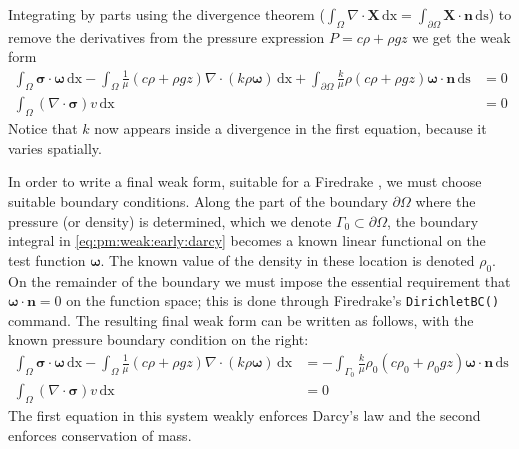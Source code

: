 \documentclass[11pt]{amsart}
\newcommand{\bn}{\mathbf{n}}
\newcommand{\bX}{\mathbf{X}}
\newcommand{\bsigma}{\bm{\sigma}}
\newcommand{\bomega}{\bm{\omega}}
\newcommand{\dx}{\mathrm{dx}}
\newcommand{\ds}{\mathrm{ds}}
\newcommand{\Div}{\nabla\cdot}
\begin{document}
Integrating by parts using the divergence theorem ($\int_\Omega \Div \bX\,\dx = \int_{\partial\Omega} \bX\cdot \bn\,\ds$) to remove the derivatives from the pressure expression $P=c\rho+\rho g z$ we get the weak form
\begin{subequations}
\label{eq:pm:weak:early}
\begin{align}
\int_\Omega \bsigma\cdot \bomega\,\dx - \int_\Omega \frac{1}{\mu} \left(c \rho + \rho g z\right) \Div(k\rho\bomega)\,\dx + \int_{\partial\Omega} \frac{k}{\mu} \rho \left(c \rho + \rho g z\right) \bomega\cdot\bn\,\ds &= 0 \label{eq:pm:weak:early:darcy}\\
\int_\Omega (\Div \bsigma) v\,\dx &= 0
\end{align}
\end{subequations}
Notice that $k$ now appears inside a divergence in the first equation, because it varies spatially.

In order to write a final weak form, suitable for a Firedrake \citep{Ham2023}, we must choose suitable boundary conditions.  Along the part of the boundary $\partial\Omega$ where the pressure (or density) is determined, which we denote $\Gamma_0 \subset \partial\Omega$, the boundary integral in \eqref{eq:pm:weak:early:darcy} becomes a known linear functional on the test function $\bomega$.  The known value of the density in these location is denoted $\rho_0$.  On the remainder of the boundary we must impose the essential requirement that $\bomega\cdot \bn=0$ on the function space; this is done through Firedrake's \verb|DirichletBC()| command.  The resulting final weak form can be written as follows, with the known pressure boundary condition on the right:
\begin{subequations}
\label{eq:pm:weak}
\begin{align}
\int_\Omega \bsigma\cdot \bomega\,\dx - \int_\Omega \frac{1}{\mu} \left(c \rho + \rho g z\right) \Div(k\rho\bomega)\,\dx &= -\int_{\Gamma_0} \frac{k}{\mu} \rho_0 \left(c \rho_0 + \rho_0 g z\right) \bomega\cdot\bn\,\ds \label{eq:pm:weak:darcy}\\
\int_\Omega (\Div \bsigma) v\,\dx &= 0
\end{align}
\end{subequations}
The first equation in this system weakly enforces Darcy's law and the second enforces conservation of mass.
\end{document}
